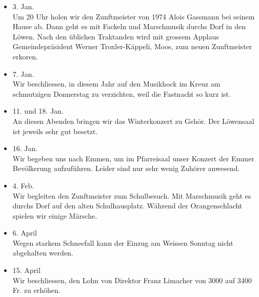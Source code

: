 \begin{history}


    \begin{itemize}

        \item[]3. Jan.\\
        Um 20 Uhr holen wir den Zunftmeister von 1974 Alois Gassmann bei seinem
        Hause ab. Dann geht es mit Fackeln und Marschmusik durchs Dorf in den
        Löwen. Nach den üblichen Traktanden wird mit grossem Applaus
        Gemeindepräsident Werner Troxler-Käppeli, Moos, zum neuen Zunftmeister
        erkoren.

        \item[]7. Jan.\\
        Wir beschliessen, in diesem Jahr auf den Musikhock im Kreuz am
        schmutzigen Donnerstag zu verzichten, weil die Fastnacht so kurz ist.

        \item[]11. und 18. Jan.\\
        An diesen Abenden bringen wir das Winterkonzert zu Gehör. Der Löwensaal
        ist jeweils sehr gut besetzt.

        \item[]16. Jan.\\
        Wir begeben uns nach Emmen, um im Pfarreisaal unser Konzert der Emmer
        Bevölkerung aufzuführen. Leider sind nur sehr wenig Zuhörer anwesend.

        \item[]4. Feb.\\
        Wir begleiten den Zunftmeister zum Schulbesuch. Mit Marschmusik geht es
        durchs Dorf auf den alten Schulhausplatz. Während der Orangenschlacht
        spielen wir einige Märsche.

        \item[]6. April\\
        Wegen starkem Schneefall kann der Einzug am Weissen Sonntag nicht
        abgehalten werden.

        \item[]15. April\\
        Wir beschliessen, den Lohn von Direktor Franz Limacher von 3000 auf 3400
        Fr. zu erhöhen.


\end{itemize}
\end{history}
